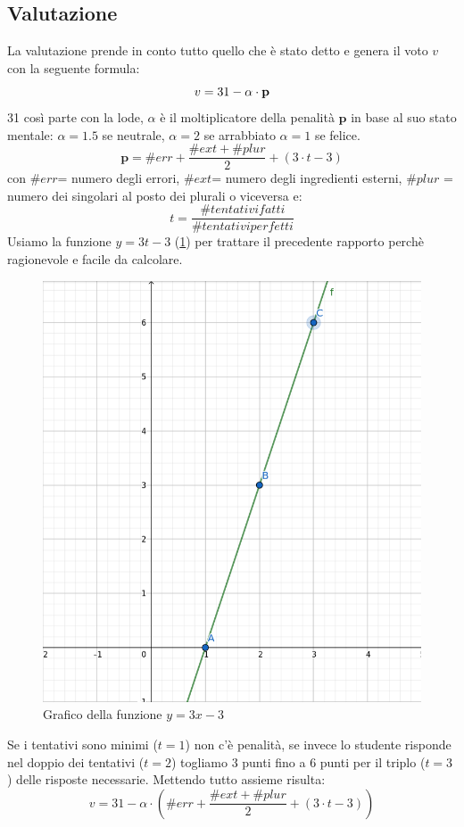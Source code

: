 \subsection{Valutazione}
La valutazione prende in conto tutto quello che è stato detto e genera il voto $v$ con la seguente formula:
\[
v = 31 - \alpha \cdot \textbf{p} \\
\]
31 così parte con la lode, $\alpha$ è il moltiplicatore della penalità $\textbf{p}$ in base al suo stato mentale: $\alpha = 1.5$ se neutrale, $\alpha=2$ se arrabbiato $\alpha = 1$ se felice.
\[
\textbf{p} = \#err + \frac{\#ext + \#plur}{2} + (3\cdot t - 3)
\]
con $\#err$= numero degli errori, $\#ext$= numero degli ingredienti esterni, $\#plur$ = numero dei singolari al posto dei plurali o viceversa e:
\[
t = \frac{\#tentativi fatti}{\# tentativi perfetti}
\]
Usiamo la funzione $y = 3t -3$  (\ref{fig:FunzioneVoto}) per trattare il precedente rapporto perchè ragionevole e facile da calcolare.
\begin{figure}[ht]
\centerline{\includegraphics[scale=0.25]{Images/3x-3.png}}
\caption{Grafico della funzione $y = 3x -3$}
\label{fig:FunzioneVoto}
\end{figure}
Se i tentativi sono minimi ($t=1$) non c'è penalità, se invece lo studente risponde nel doppio dei tentativi ($t=2$) togliamo 3 punti fino a 6 punti per il triplo ($t=3$) delle risposte necessarie.
\newline
Mettendo tutto assieme risulta:
\[
v = 31 - \alpha \cdot (\#err + \frac{\#ext + \#plur}{2} + (3\cdot t - 3))
\]